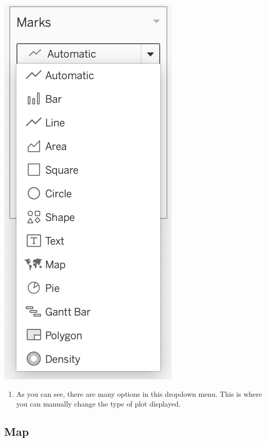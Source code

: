 \documentclass[
]{book}
\providecommand{\tightlist}{%
  \setlength{\itemsep}{0pt}\setlength{\parskip}{0pt}}
\begin{document}
\includegraphics{images/M3S2_Plot-types.png}

\begin{enumerate}
\def\labelenumi{\arabic{enumi}.}
\setcounter{enumi}{1}
\tightlist
\item
  As you can see, there are many options in this dropdown menu. This is where you can manually change the type of plot displayed.
\end{enumerate}

\hypertarget{map}{%
\subsection{Map}\label{map}}
\end{document}
